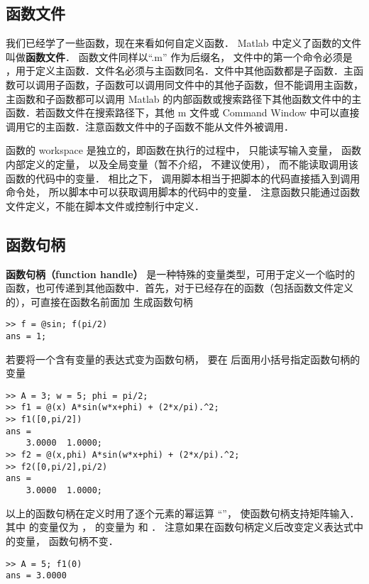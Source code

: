 

\subsection{函数文件}

我们已经学了一些函数，现在来看如何自定义函数． Matlab 中定义了函数的文件叫做\textbf{函数文件}． 函数文件同样以“.m” 作为后缀名， 文件中的第一个命令必须是 ，用于定义主函数．文件名必须与主函数同名．文件中其他函数都是子函数．主函数可以调用子函数，子函数可以调用同文件中的其他子函数，但不能调用主函数，主函数和子函数都可以调用 Matlab 的内部函数或搜索路径下其他函数文件中的主函数．若函数文件在搜索路径下，其他 m 文件或 Command Window 中可以直接调用它的主函数．注意函数文件中的子函数不能从文件外被调用．

函数的 workspace 是独立的，即函数在执行的过程中， 只能读写输入变量， 函数内部定义的定量， 以及全局变量（暂不介绍， 不建议使用）， 而不能读取调用该函数的代码中的变量． 相比之下， 调用脚本相当于把脚本的代码直接插入到调用命令处， 所以脚本中可以获取调用脚本的代码中的变量． 注意函数只能通过函数文件定义，不能在脚本文件或控制行中定义．

\subsection{函数句柄}
\textbf{函数句柄（function handle）} 是一种特殊的变量类型，可用于定义一个临时的函数，也可传递到其他函数中．首先，对于已经存在的函数（包括函数文件定义的），可直接在函数名前面加  生成函数句柄
\begin{lstlisting}[language=MatlabCom]
>> f = @sin; f(pi/2)
ans = 1;
\end{lstlisting}
若要将一个含有变量的表达式变为函数句柄， 要在  后面用小括号指定函数句柄的变量
\begin{lstlisting}[language=MatlabCom]
>> A = 3; w = 5; phi = pi/2;
>> f1 = @(x) A*sin(w*x+phi) + (2*x/pi).^2;
>> f1([0,pi/2])
ans =
    3.0000  1.0000;
>> f2 = @(x,phi) A*sin(w*x+phi) + (2*x/pi).^2;
>> f2([0,pi/2],pi/2)
ans =
    3.0000  1.0000;
\end{lstlisting}
以上的函数句柄在定义时用了逐个元素的幂运算 “”， 使函数句柄支持矩阵输入． 其中  的变量仅为 ，  的变量为  和 ． 注意如果在函数句柄定义后改变定义表达式中的变量， 函数句柄不变．
\begin{lstlisting}[language=MatlabCom]
>> A = 5; f1(0)
ans = 3.0000
\end{lstlisting}

